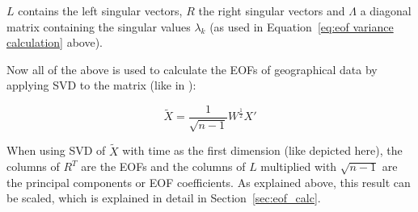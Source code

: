 $L$ contains the left singular vectors, $R$ the right singular vectors and $\Lambda$ a diagonal matrix containing the singular values $\lambda_k$ (as used in Equation~\ref{eq:eof variance calculation} above). 

Now all of the above is used to calculate the EOFs of geographical data by applying SVD to the matrix (like in ): 

\begin{equation}
  \tilde{X} = \frac{1}{\sqrt{n - 1}} W^{\frac{1}{2}} X' 
  \label{eq:complete data preperation}
\end{equation}


When using SVD of $\tilde{X}$ with time as the first dimension (like depicted here), the columns of $R^T$ are the EOFs and the columns of $L$ multiplied with $\sqrt{n - 1}$ are the principal components or EOF coefficients.
As explained above, this result can be scaled, which is explained in detail in Section~\ref{sec:eof_calc}.



